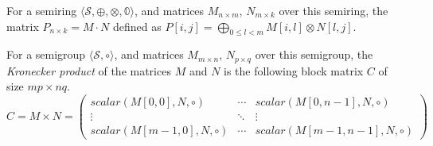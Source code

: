 %
%
\begin{definition}\label{def:MxM}

For a semiring $\langle \mathcal{S}, \oplus, \otimes, \mathbb{0} \rangle$, and matrices $M_{n \times m}$, $N_{m \times k}$ over this semiring, the matrix
$
P_{n \times k}= M \cdot N
$
defined as $P[i, j] = \bigoplus_{0 \leq l < m} M[i, l] \otimes N[l, j]$.

\end{definition}

%
%
\begin{definition}

\label{def:kron}
For a semigroup $\langle \mathcal{S}, \circ \rangle$, and matrices $M_{m \times n}$, $N_{p \times q}$ over this semigroup, the \textit{Kronecker product} of the matrices $M$ and $N$ is the following block matrix $C$ of size $mp \times nq$.
$$
C = M \times N =
\begin{pmatrix}
scalar(M[0, 0], N, \circ)   & \cdots & scalar(M[0, n - 1], N, \circ)   \\
\vdots                   & \ddots & \vdots       \\
scalar(M[m - 1, 0], N, \circ) & \cdots & scalar(M[m - 1, n - 1], N, \circ)
\end{pmatrix}
$$

\end{definition}


